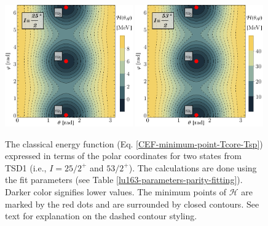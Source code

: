 \begin{figure}
    \centering
    \includegraphics[width=0.49\textwidth]{Chapters/Figures/parity-partners-plots/contour-tsd1-1.pdf}
    \includegraphics[width=0.49\textwidth]{Chapters/Figures/parity-partners-plots/contour-tsd1-2.pdf}
    \caption{The classical energy function (Eq. \ref{CEF-minimum-point-Tcore-Tsp}) expressed in terms of the polar coordinates for two states from TSD1 (i.e., $I=25/2^+$ and $53/2^+$). The calculations are done using the fit parameters (see Table \ref{lu163-parameters-parity-fitting}). Darker color signifies lower values. The minimum points of $\mathcal{H}$ are marked by the red dots and are surrounded by closed contours. See text for explanation on the dashed contour styling.}
    \label{contour-cef-polar-tsd1}
\end{figure}
